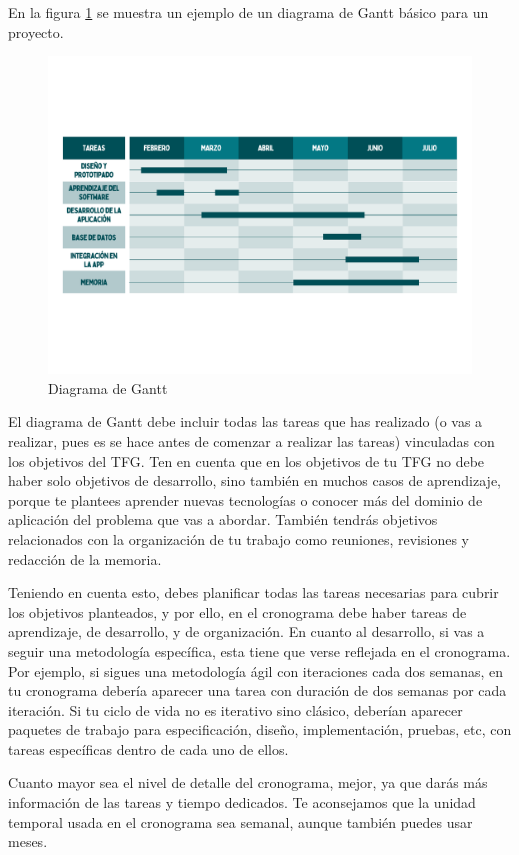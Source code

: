 En la figura \ref{fig:gantt} se muestra un ejemplo de un diagrama de Gantt básico para un proyecto.

\begin{figure}[!t]
    \centering
    \includegraphics[width=.8\textwidth]{images/EjemploGantt.pdf}
    \caption{Diagrama de Gantt\label{fig:gantt}}
\end{figure}

El diagrama de Gantt debe incluir todas las tareas que has realizado (o vas a realizar, pues es se hace antes de comenzar a realizar las tareas) vinculadas con los objetivos del TFG. Ten en cuenta que en los objetivos de tu TFG no debe haber solo objetivos de desarrollo, sino también en muchos casos de aprendizaje, porque te plantees aprender nuevas tecnologías o conocer más del dominio de aplicación del problema que vas a abordar. También tendrás objetivos relacionados con la organización de tu trabajo como reuniones, revisiones y redacción de la memoria. 

Teniendo en cuenta esto, debes planificar todas las tareas necesarias para cubrir los objetivos planteados, y por ello, en el cronograma debe haber tareas de aprendizaje, de desarrollo, y de organización. En cuanto al desarrollo, si vas a seguir una metodología específica, esta tiene que verse reflejada en el cronograma. Por ejemplo, si sigues una metodología ágil con iteraciones cada dos semanas, en tu cronograma debería aparecer una tarea con duración de dos semanas por cada iteración. Si tu ciclo de vida no es iterativo sino clásico, deberían aparecer paquetes de trabajo para especificación, diseño, implementación, pruebas, etc, con tareas específicas dentro de cada uno de ellos.

Cuanto mayor sea el nivel de detalle del cronograma, mejor, ya que darás más información de las tareas y tiempo dedicados. Te aconsejamos que la unidad temporal usada en el cronograma sea semanal, aunque también puedes usar meses. 

